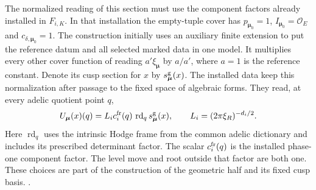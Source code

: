 The normalized reading of this section must use the component
factors already installed in \(F_{i,K}\). In that installation
the empty-tuple cover has \(p_{\boldsymbol\mu_0}=1\),
\(I_{\boldsymbol\mu_0}=\mathcal O_E\) and
\(c_{\delta,\boldsymbol\mu_0}=1\). The construction initially
uses an auxiliary finite extension to put the reference datum
and all selected marked data in one model. It multiplies every
other cover function of reading \(a'\xi_{\boldsymbol\mu}\) by
\(a/a'\), where \(a=1\) is the reference constant. Denote its
cusp section for \(x\) by \(s^{\rm g}_{\boldsymbol\mu}(x)\).
The installed data keep this normalization after passage to the
fixed space of algebraic forms. They read, at every adelic
quotient point \(q\),
\[
 U_{\boldsymbol\mu}(x)(q)
    = L_i c_i^{\rm fr}(q)\,\operatorname{rd}_{q}
             s^{\rm g}_{\boldsymbol\mu}(x),
 \qquad L_i=(2\pi\xi_R)^{-d_i/2}.
\]
Here \(\operatorname{rd}_{q}\) uses the intrinsic Hodge frame
from the common adelic dictionary and includes its prescribed
determinant factor. The scalar \(c_i^{\rm fr}(q)\) is the
installed phase-one component factor. The level move and root
outside that factor are both one. These choices are part of
the construction of the geometric half and its fixed cusp
basis.
.

